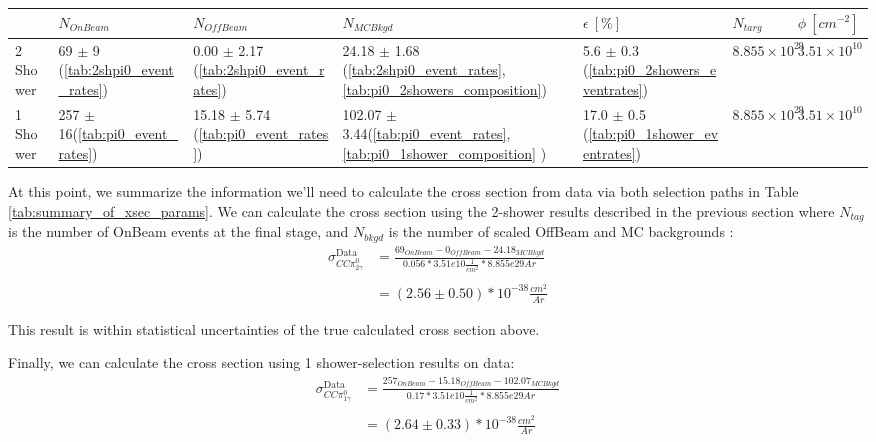 \begin{table*}
\centering
{}
 \begin{tabular}{|l|l|l|l|l|l|l|}
 \hline
 & $N_{OnBeam}$ & $N_{OffBeam}$ & $N_{MCBkgd}$ & $\epsilon~[\%]$ & $N_{targ}$ & $\phi ~[cm^{-2}]$  \\ [0.1ex] \hline
2 Shower & 69 $\pm$ 9 (\ref{tab:2shpi0_event_rates}) & 0.00 $\pm$ 2.17 (\ref{tab:2shpi0_event_rates}) & 24.18 $\pm$ 1.68 (\ref{tab:2shpi0_event_rates}, \ref{tab:pi0_2showers_composition}) & 5.6 $\pm$ 0.3 (\ref{tab:pi0_2showers_eventrates}) & $8.855\times10^{29}$ & $3.51\times10^{10}$\\ \hline
1 Shower & 257 $\pm$ 16(\ref{tab:pi0_event_rates}) & 15.18 $\pm$ 5.74 (\ref{tab:pi0_event_rates}) & 102.07 $\pm$ 3.44(\ref{tab:pi0_event_rates}, \ref{tab:pi0_1shower_composition} ) & 17.0 $\pm$ 0.5 (\ref{tab:pi0_1shower_eventrates}) & $8.855\times10^{29}$ & $3.51\times10^{10}$\\ \hline

\end{tabular}
\end{table*}

\par At this point, we summarize the information we'll need to calculate the cross section from data via both selection paths in Table \ref{tab:summary_of_xsec_params}. We can calculate the cross section using the 2-shower results described in the previous section where $N_{tag}$ is the number of OnBeam events at the final stage, and $N_{bkgd}$ is the number of scaled OffBeam and MC backgrounds :
\begin{align}
\sigma^{\text{Data}}_{CC\pi^0_{2\gamma}} &= \frac{69_{OnBeam} - 0_{OffBeam} - 24.18_{MCBkgd}}{0.056 * 3.51e10 \frac{1}{cm^2} * 8.855e29 Ar} \\\\
&= (2.56 \pm 0.50) *10^{-38} \frac{cm^2}{Ar}
\end{align}

This result is within statistical uncertainties of the true calculated cross section above. 

\par Finally, we can calculate the cross section using 1 shower-selection results on data:
\begin{align}
\sigma^{\text{Data}}_{CC\pi^0_{1\gamma}} &= \frac{257_{OnBeam} - 15.18_{OffBeam} - 102.07_{MCBkgd}}{0.17 * 3.51e10 \frac{1}{cm^2} * 8.855e29 Ar} \\\\
&= (2.64 \pm 0.33) *10^{-38} \frac{cm^2}{Ar}
\end{align}

